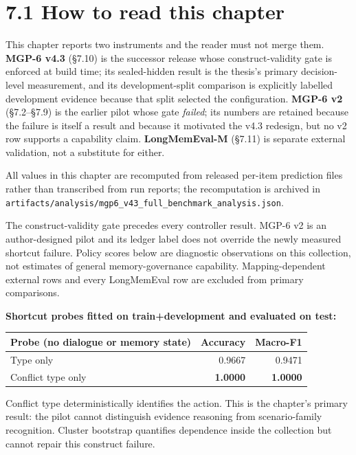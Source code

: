 \section{7.1 How to read this chapter}\label{how-to-read-this-chapter}

This chapter reports two instruments and the reader must not merge them.
\textbf{MGP-6 v4.3} (§7.10) is the successor release whose
construct-validity gate is enforced at build time; its sealed-hidden
result is the thesis's primary decision-level measurement, and its
development-split comparison is explicitly labelled development evidence
because that split selected the configuration. \textbf{MGP-6 v2}
(§7.2--§7.9) is the earlier pilot whose gate \emph{failed}; its numbers
are retained because the failure is itself a result and because it
motivated the v4.3 redesign, but no v2 row supports a capability claim.
\textbf{LongMemEval-M} (§7.11) is separate external validation, not a
substitute for either.

All values in this chapter are recomputed from released per-item
prediction files rather than transcribed from run reports; the
recomputation is archived in
\texttt{artifacts/analysis/mgp6\_v43\_full\_benchmark\_analysis.json}.

The construct-validity gate precedes every controller result. MGP-6 v2
is an author-designed pilot and its ledger label does not override the
newly measured shortcut failure. Policy scores below are diagnostic
observations on this collection, not estimates of general
memory-governance capability. Mapping-dependent external rows and every
LongMemEval row are excluded from primary comparisons.

\textbf{Shortcut probes fitted on train+development and evaluated on
test:}

{\def\LTcaptype{none} %
\begin{longtable}[]{@{}lrr@{}}
\toprule\noalign{}
Probe (no dialogue or memory state) & Accuracy & Macro-F1 \\
\midrule\noalign{}
\endhead
\bottomrule\noalign{}
\endlastfoot
Type only & 0.9667 & 0.9471 \\
Conflict type only & \textbf{1.0000} & \textbf{1.0000} \\
\end{longtable}
}

Conflict type deterministically identifies the action. This is the
chapter's primary result: the pilot cannot distinguish evidence
reasoning from scenario-family recognition. Cluster bootstrap quantifies
dependence inside the collection but cannot repair this construct
failure.

